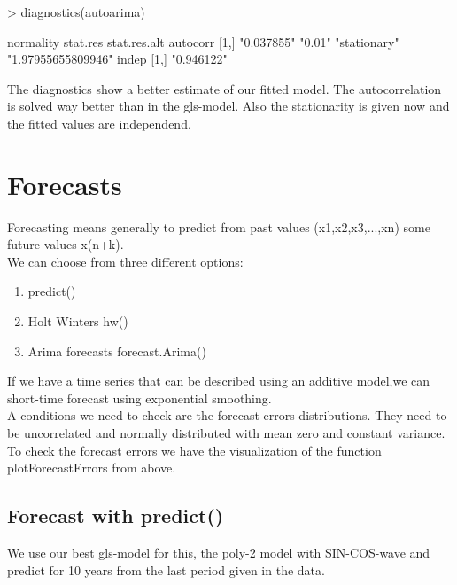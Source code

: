 \documentclass[10pt, a4paper]{article} %
\begin{document}
\begin{Schunk}
\begin{Sinput}
> diagnostics(autoarima)
\end{Sinput}
\begin{Soutput}
     normality  stat.res stat.res.alt autocorr          
[1,] "0.037855" "0.01"   "stationary" "1.97955655809946"
     indep     
[1,] "0.946122"
\end{Soutput}
\end{Schunk}

The diagnostics show a better estimate of our fitted model. 
The autocorrelation is solved way better than in the gls-model. Also the stationarity is given now and the fitted values are independend. 



\section{Forecasts}%
Forecasting means generally to predict from past values (x1,x2,x3,...,xn) some future values x(n+k). \\

We can choose from three different options: 
\begin{enumerate}
\item predict()
\item Holt Winters hw()
\item Arima forecasts forecast.Arima()
\end{enumerate}

If we have a time series that can be described using an additive model,we can short-time forecast using exponential smoothing.\\
A conditions we need to check are the forecast errors distributions. They need to be uncorrelated and normally distributed with mean zero and constant variance. To check the forecast errors we have the visualization of the function plotForecastErrors from above. 

\subsection{Forecast with predict()}
We use our best gls-model for this, the poly-2 model with SIN-COS-wave and predict for 10 years from the last period given in the data. 
\end{document}
